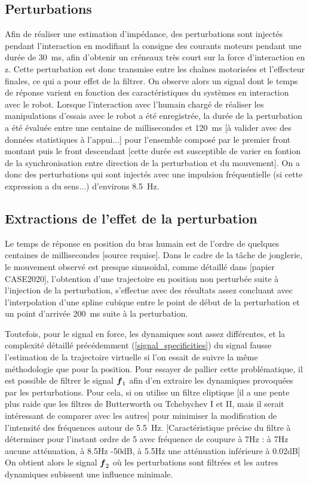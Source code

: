 \documentclass[12pt, a4paper]{article} %
\numberwithin{equation}{section}
\begin{document}
	\subsection{Perturbations}
	
	Afin de réaliser une estimation d'impédance, des perturbations sont injectés pendant l'interaction en modifiant la consigne des courants moteurs pendant une durée de \SI{30}{\milli\second}, afin d'obtenir un créneaux très court sur la force d'interaction en z. Cette perturbation est donc transmise entre les chaînes motorisées et l'effecteur finales, ce qui a pour effet de la filtrer. On observe alors un signal dont le temps de réponse varient en fonction des caractéristiques du systèmes en interaction avec le robot. Lorsque l'interaction avec l'humain chargé de réaliser les manipulations d'essais avec le robot a été enregistrée, la durée de la perturbation a été évaluée entre une centaine de millisecondes et \SI{120}{\milli\second} [à valider avec des données statistiques à l'appui...] pour l'ensemble composé par le premier front montant puis le front descendant [cette durée est susceptible de varier en fontion de la synchronisation entre direction de la perturbation et du mouvement]. On a donc des perturbations qui sont injectés avec une impulsion fréquentielle (si cette expression a du sens...) d'environs \SI{8.5}{\hertz}.
	
	\subsection{Extractions de l'effet de la perturbation}
	
	Le temps de réponse en position du bras humain est de l'ordre de quelques centaines de millisecondes [source requise]. Dans le cadre de la tâche de jonglerie, le mouvement observé est presque sinusoïdal, comme détaillé dans [papier CASE2020], l'obtention d'une trajectoire en position non perturbée suite à l'injection de la perturbation, s'effectue avec des résultats assez concluant avec l'interpolation d'une spline cubique entre le point de début de la perturbation et un point d'arrivée \SI{200}{\milli\second} suite à la perturbation. 
	
	Toutefois, pour le signal en force, les dynamiques sont assez différentes, et la complexité détaillé précédemment (\cref{signal_specificities}) du signal fausse l'estimation de la trajectoire virtuelle si l'on essait de suivre la même méthodologie que pour la position. Pour essayer de pallier cette problématique, il est possible de filtrer le signal $ \vect{f}_1 $ afin d'en extraire les dynamiques provoquées par les perturbations. Pour cela, si on utilise un filtre eliptique [il a une pente plus raide que les filtres de Butterworth ou Tchebychev I et II, mais il serait intéressant de comparer avec les autres] pour minimiser la modification de l'intensité des fréquences autour de \SI{5.5}{\hertz}. [Caractéristique précise du filtre à déterminer pour l'instant ordre de 5 avec fréquence de coupure à 7Hz : à 7Hz aucune atténuation, à 8.5Hz -50dB, à 5.5Hz une atténuation inférieure à 0.02dB] On obtient alors le signal $ \vect{f}_2 $ où les perturbations sont filtrées et les autres dynamiques subissent une influence minimale.
\end{document}
